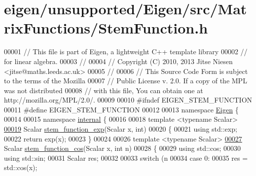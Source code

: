 \hypertarget{eigen_2unsupported_2_eigen_2src_2_matrix_functions_2_stem_function_8h_source}{}\section{eigen/unsupported/\+Eigen/src/\+Matrix\+Functions/\+Stem\+Function.h}
\label{eigen_2unsupported_2_eigen_2src_2_matrix_functions_2_stem_function_8h_source}

\begin{DoxyCode}
00001 \textcolor{comment}{// This file is part of Eigen, a lightweight C++ template library}
00002 \textcolor{comment}{// for linear algebra.}
00003 \textcolor{comment}{//}
00004 \textcolor{comment}{// Copyright (C) 2010, 2013 Jitse Niesen <jitse@maths.leeds.ac.uk>}
00005 \textcolor{comment}{//}
00006 \textcolor{comment}{// This Source Code Form is subject to the terms of the Mozilla}
00007 \textcolor{comment}{// Public License v. 2.0. If a copy of the MPL was not distributed}
00008 \textcolor{comment}{// with this file, You can obtain one at http://mozilla.org/MPL/2.0/.}
00009 
00010 \textcolor{preprocessor}{#ifndef EIGEN\_STEM\_FUNCTION}
00011 \textcolor{preprocessor}{#define EIGEN\_STEM\_FUNCTION}
00012 
00013 \textcolor{keyword}{namespace }\hyperlink{namespace_eigen}{Eigen} \{ 
00014 
00015 \textcolor{keyword}{namespace }\hyperlink{namespaceinternal}{internal} \{
00016 
00018 \textcolor{keyword}{template} <\textcolor{keyword}{typename} Scalar>
\hyperlink{namespace_eigen_1_1internal_a0e7bafccf7fa66d965ab6c59444a39c3}{00019} Scalar \hyperlink{namespace_eigen_1_1internal_a0e7bafccf7fa66d965ab6c59444a39c3}{stem\_function\_exp}(Scalar x, \textcolor{keywordtype}{int})
00020 \{
00021   \textcolor{keyword}{using} std::exp;
00022   \textcolor{keywordflow}{return} exp(x);
00023 \}
00024 
00026 \textcolor{keyword}{template} <\textcolor{keyword}{typename} Scalar>
\hyperlink{namespace_eigen_1_1internal_a9727c15ffb97a40df226fce93e2628b3}{00027} Scalar \hyperlink{namespace_eigen_1_1internal_a9727c15ffb97a40df226fce93e2628b3}{stem\_function\_cos}(Scalar x, \textcolor{keywordtype}{int} n)
00028 \{
00029   \textcolor{keyword}{using} std::cos;
00030   \textcolor{keyword}{using} std::sin;
00031   Scalar res;
00032 
00033   \textcolor{keywordflow}{switch} (n %
00034   \textcolor{keywordflow}{case} 0: 
00035     res = std::cos(x);

\end{DoxyCode}
